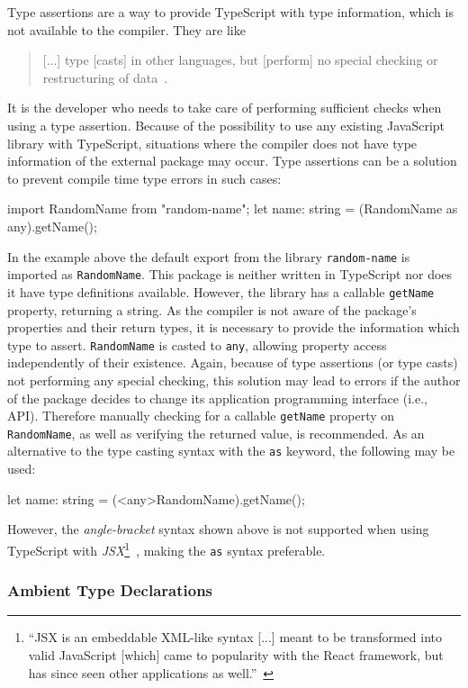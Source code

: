 Type assertions are a way to provide TypeScript with type information, which is not available to the compiler. They are like
\begin{quote}
  [...] type [casts] in other languages, but [perform] no special checking or restructuring of data~\cite{TypeScriptHandbook:BasicTypes}.
\end{quote}
It is the developer who needs to take care of performing sufficient checks when using a type assertion. Because of the possibility to use any existing JavaScript library with TypeScript, situations where the compiler does not have type information of the external package may occur. Type assertions can be a solution to prevent compile time type errors in such cases:
\begin{JsCode}[numbers=none]
import RandomName from "random-name";
let name: string = (RandomName as any).getName();
\end{JsCode}
In the example above the default export from the library \texttt{random-name} is imported as \texttt{RandomName}. This package is neither written in TypeScript nor does it have type definitions available. However, the library has a callable \texttt{getName} property, returning a string. As the compiler is not aware of the package's properties and their return types, it is necessary to provide the information which type to assert. \texttt{RandomName} is casted to \texttt{any}, allowing property access independently of their existence. Again, because of type assertions (or type casts) not performing any special checking, this solution may lead to errors if the author of the package decides to change its application programming interface (i.e., API). Therefore manually checking for a callable \texttt{getName} property on \texttt{RandomName}, as well as verifying the returned value, is recommended.
As an alternative to the type casting syntax with the \texttt{as} keyword, the following may be used:
\begin{JsCode}[numbers=none]
let name: string = (<any>RandomName).getName();
\end{JsCode}
However, the \emph{angle-bracket} syntax shown above is not supported when using TypeScript with \emph{JSX}\footnote{``JSX is an embeddable XML-like syntax [...] meant to be transformed into valid JavaScript [which] came to popularity with the React framework, but has since seen other applications as well.''~\cite{TypeScriptHandbook:JSX}}~\cite{TypeScriptHandbook:BasicTypes}, making the \texttt{as} syntax preferable.

\subsubsection{Ambient Type Declarations}

